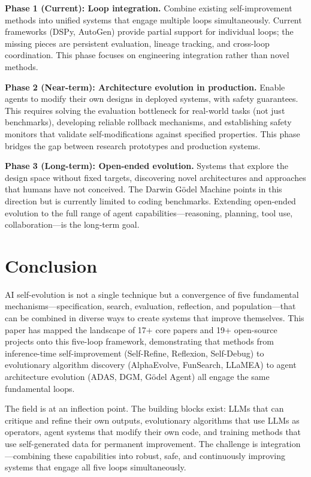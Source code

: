 \documentclass[11pt,a4paper]{article}
\begin{document}
\textbf{Phase 1 (Current): Loop integration.} Combine existing self-improvement methods into unified systems that engage multiple loops simultaneously. Current frameworks (DSPy, AutoGen) provide partial support for individual loops; the missing pieces are persistent evaluation, lineage tracking, and cross-loop coordination. This phase focuses on engineering integration rather than novel methods.

\textbf{Phase 2 (Near-term): Architecture evolution in production.} Enable agents to modify their own designs in deployed systems, with safety guarantees. This requires solving the evaluation bottleneck for real-world tasks (not just benchmarks), developing reliable rollback mechanisms, and establishing safety monitors that validate self-modifications against specified properties. This phase bridges the gap between research prototypes and production systems.

\textbf{Phase 3 (Long-term): Open-ended evolution.} Systems that explore the design space without fixed targets, discovering novel architectures and approaches that humans have not conceived. The Darwin G\"{o}del Machine points in this direction but is currently limited to coding benchmarks. Extending open-ended evolution to the full range of agent capabilities---reasoning, planning, tool use, collaboration---is the long-term goal.

\section{Conclusion}
\label{sec:conclusion}

AI self-evolution is not a single technique but a convergence of five fundamental mechanisms---specification, search, evaluation, reflection, and population---that can be combined in diverse ways to create systems that improve themselves. This paper has mapped the landscape of 17+ core papers and 19+ open-source projects onto this five-loop framework, demonstrating that methods from inference-time self-improvement (Self-Refine, Reflexion, Self-Debug) to evolutionary algorithm discovery (AlphaEvolve, FunSearch, LLaMEA) to agent architecture evolution (ADAS, DGM, G\"{o}del Agent) all engage the same fundamental loops.

The field is at an inflection point. The building blocks exist: LLMs that can critique and refine their own outputs, evolutionary algorithms that use LLMs as operators, agent systems that modify their own code, and training methods that use self-generated data for permanent improvement. The challenge is integration---combining these capabilities into robust, safe, and continuously improving systems that engage all five loops simultaneously.
\end{document}
